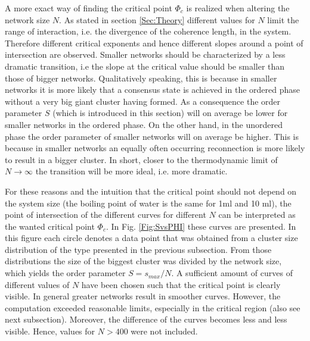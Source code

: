 \documentclass[11pt]{article}
\begin{document}
A more exact way of finding the critical point $\Phi_c$ is realized when altering the network size $N$. As stated in section \ref{Sec:Theory} different values for $N$ limit the range of interaction, i.e. the divergence of the coherence length, in the system. Therefore different critical exponents and hence different slopes around a point of intersection are observed. Smaller networks should be characterized by a less dramatic transition, i.e the slope at the critical value should be smaller than those of bigger networks. Qualitatively speaking, this is because in smaller networks it is more likely that a consensus state is achieved in the ordered phase without a very big giant cluster having formed. As a consequence the order parameter $S$ (which is introduced in this section) will on average be lower for smaller networks in the ordered phase. On the other hand, in the unordered phase the order parameter of smaller networks will on average be higher. This is because in smaller networks an equally often occurring reconnection is more likely to result in a bigger cluster. In short, closer to the thermodynamic limit of $N \rightarrow \infty$ the transition will be more ideal, i.e. more dramatic.

For these reasons and the intuition that the critical point should not depend on the system size (the boiling point of water is the same for 1ml and 10 ml), the point of intersection of the different curves for different $N$ can be interpreted as the wanted critical point $\Phi_c$. In Fig. \ref{Fig:SvsPHI} these curves are presented. In this figure each circle denotes a data point that was obtained from a cluster size distribution of the type presented in the previous subsection. From those distributions the size of the biggest cluster was divided by the network size, which yields the order parameter $S = s_{max}/N$. A sufficient amount of curves of different values of $N$ have been chosen such that the critical point is clearly visible. In general greater networks result in smoother curves. However, the computation exceeded reasonable limits, especially in the critical region (also see next subsection). Moreover, the difference of the curves becomes less and less visible. Hence, values for $N>400$ were not included. 
\end{document}
